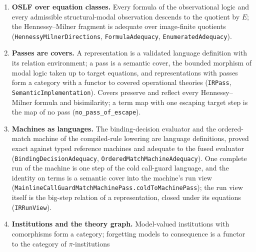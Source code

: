 \documentclass[11pt]{article}
\theoremstyle{definition}
\theoremstyle{remark}
\begin{document}
\begin{enumerate}
  theorem \nolinkurl{stepModuloEquations_iff_step_of_no_generators}, not a
  second implementation, and the core is named for it
  (\texttt{StepModuloEquations}, \texttt{gsltModuloEquations},
  \nolinkurl{ProtocolModuloEquations}).  Presentation-derived laws (bag and set
  permutation, flattening, units) are generators of $E$, with their
  substitution and renaming stability discharged for the generic case and
  for rho; in the Cost lane a derived occurrence carries its declaring
  carrier or algebra rule as origin and no static colour, and for rho every
  such occurrence is a bag permutation absorbed by the base canonicalizer
  (\nolinkurl{rho_costDerivedInstance_canonicalize_eq}).
\item \textbf{OSLF over equation classes.}  Every formula of the observational
  logic and every admissible structural-modal observation descends to the
  quotient by $E$; the Hennessy--Milner fragment is adequate over
  image-finite quotients (\nolinkurl{HennessyMilnerDirections},
  \texttt{FormulaAdequacy}, \texttt{EnumeratedAdequacy}).
\item \textbf{Passes are covers.}  A representation is a validated language
  definition with its relation environment; a pass is a semantic cover,
  the bounded morphism of modal logic taken up to target equations, and
  representations with passes form a category with a functor to covered
  operational theories (\texttt{IRPass}, \nolinkurl{SemanticImplementation}).
  Covers preserve and reflect every Hennessy--Milner formula and
  bisimilarity; a term map with one escaping target step is the map of no
  pass (\nolinkurl{no_pass_of_escape}).
\item \textbf{Machines as languages.}  The binding-decision evaluator and the
  ordered-match machine of the compiled-rule lowering are language
  definitions, proved exact against typed reference machines and adequate
  to the fused evaluator (\nolinkurl{BindingDecisionAdequacy},
  \nolinkurl{OrderedMatchMachineAdequacy}).  One complete run of the machine is
  one step of the cold call-guard language, and the identity on terms is a
  semantic cover into the machine's run view
  (\nolinkurl{MainlineCallGuardMatchMachinePass.coldToMachinePass}); the run view
  itself is the big-step relation of a representation, closed under its
  equations (\texttt{IRRunView}).
\item \textbf{Institutions and the theory graph.}  Model-valued institutions
  with comorphisms form a category; forgetting models to consequence is a
  functor to the category of $\pi$-institutions

\end{enumerate}
\end{document}
